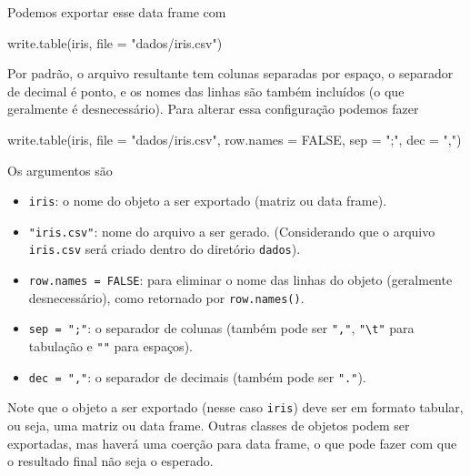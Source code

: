 \documentclass[
  10pt,
  a4paper]{book}
\newenvironment{Shaded}{\begin{snugshade}}{\end{snugshade}}
\newcommand{\AttributeTok}[1]{\textcolor[rgb]{0.77,0.63,0.00}{#1}}
\newcommand{\ConstantTok}[1]{\textcolor[rgb]{0.00,0.00,0.00}{#1}}
\newcommand{\FunctionTok}[1]{\textcolor[rgb]{0.00,0.00,0.00}{#1}}
\newcommand{\NormalTok}[1]{#1}
\newcommand{\StringTok}[1]{\textcolor[rgb]{0.31,0.60,0.02}{#1}}
\providecommand{\tightlist}{%
  \setlength{\itemsep}{0pt}\setlength{\parskip}{0pt}}
\begin{document}
Podemos exportar esse data frame com

\begin{Shaded}
\begin{Highlighting}[]
\FunctionTok{write.table}\NormalTok{(iris, }\AttributeTok{file =} \StringTok{"dados/iris.csv"}\NormalTok{)}
\end{Highlighting}
\end{Shaded}

Por padrão, o arquivo resultante tem colunas separadas por espaço, o
separador de decimal é ponto, e os nomes das linhas são também
incluídos (o que geralmente é desnecessário).
Para alterar essa configuração podemos fazer

\begin{Shaded}
\begin{Highlighting}[]
\FunctionTok{write.table}\NormalTok{(iris, }\AttributeTok{file =} \StringTok{"dados/iris.csv"}\NormalTok{, }\AttributeTok{row.names =} \ConstantTok{FALSE}\NormalTok{,}
            \AttributeTok{sep =} \StringTok{";"}\NormalTok{, }\AttributeTok{dec =} \StringTok{","}\NormalTok{)}
\end{Highlighting}
\end{Shaded}

Os argumentos são

\begin{itemize}
\tightlist
\item
  \texttt{iris}: o nome do objeto a ser exportado (matriz ou data frame).
\item
  \texttt{"iris.csv"}: nome do arquivo a ser gerado. (Considerando que o
  arquivo \texttt{iris.csv} será criado dentro do diretório \texttt{dados}).
\item
  \texttt{row.names\ =\ FALSE}: para eliminar o nome das linhas do objeto
  (geralmente desnecessário), como retornado por \texttt{row.names()}.
\item
  \texttt{sep\ =\ ";"}: o separador de colunas (também pode ser \texttt{","}, \texttt{"\textbackslash{}t"}
  para tabulação e \texttt{""} para espaços).
\item
  \texttt{dec\ =\ ","}: o separador de decimais (também pode ser \texttt{"."}).
\end{itemize}

Note que o objeto a ser exportado (nesse caso \texttt{iris}) deve ser em
formato tabular, ou seja, uma matriz ou data frame. Outras classes de
objetos podem ser exportadas, mas haverá uma coerção para data frame, o
que pode fazer com que o resultado final não seja o esperado.
\end{document}
